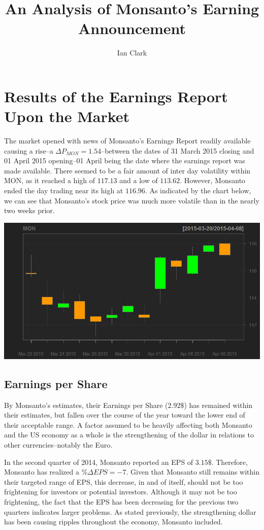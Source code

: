 \documentclass[11pt,letterpaper,english]{article}
\title{An Analysis of Monsanto's Earning Announcement}
\author{Ian Clark}
\date{}
\newcommand{\newpar}{\vspace{10mm}\noindent}
\begin{document}
\maketitle

\section{Results of the Earnings Report Upon the Market}
The market opened with news of Monsanto's Earnings Report readily available causing a rise--a $\Delta{P_{MON}} = 1.54 $--between the dates of 31 March 2015 closing and 01 April 2015 opening--01 April being the date where the earnings report was made available. There seemed to be a fair amount of inter day volatility within MON, as it reached a high of $117.13$ and a low of $113.62$. However, Monsanto ended the day trading near its high at $116.96$. As indicated by the chart below, we can see that Monsanto's stock price was much more volatile than in the nearly two weeks prior.

\newpar
\begin{center}
\includegraphics[scale=0.5]{Data/CandleChart.png}
\end{center}

\newpar
\subsection{Earnings per Share}
By Monsanto's estimates, their Earnings per Share ($2.92 \$ $) has remained within their estimates, but fallen over the course of the year toward the lower end of their acceptable range. A factor assumed to be heavily affecting both Monsanto and the US economy as a whole is the strengthening of the dollar in relations to other currencies--notably the Euro.

\newpar
In the second quarter of 2014, Monsanto reported an EPS of $3.15 \$ $. Therefore, Monsanto has realized a $\%\Delta{EPS} = -7$. Given that Monsanto still remains within their targeted range of EPS, this decrease, in and of itself, should not be too frightening for investors or potential investors. Although it may not be too frightening, the fact that the EPS has been decreasing for the previous two quarters indicates larger problems. As stated previously, the strengthening dollar has been causing ripples throughout the economy, Monsanto included.
\end{document}
